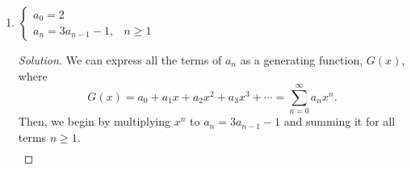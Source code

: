 \documentclass{article}
\newenvironment{solution}
  {\renewcommand\qedsymbol{$\blacksquare$}\begin{proof}[Solution]}
  {\end{proof}}
\begin{document}
\begin{enumerate}
\begin{solution}
        Then, since we have the equality $a_n = 2a_{n-1}$, we can multiply both sides by $x^n$ and get the sum of all the terms over $n\geq 1$. We do this so we can eventually solve for $G(x)$, itself an infinite series.\begin{align*} 
            a_n x^n &= 2a_{n-1} x^n \\
            \sum_{n=1}^\infty a_n x^n &= \sum_{n=1}^\infty 2a_{n-1} x^n 
            \intertext{Here, we need to use series manipulation techniques. The handouts are pretty good at explaining them, but I'll show them as clearly as possible regardless.}
            \sum_{n=1}^\infty a_n x^n &= 2\sum_{n=1}^\infty a_{n-1} x^n \\
            a_1 x + a_2 x^2 + a_3 x^3 + \cdots &= 2(a_0 x + a_1 x^2 + a_2 x^3 + \cdots ) &\text{expanding the series} \\
            (a_0 + a_1 x + a_2 x^2 + \cdots) - a_0 &= 2\cdot x(a_0 + a_1 x + a_2 x^2 + \cdots) &\text{factoring out}~x 
            \intertext{Now, we see that the series inside parentheses are equivalent to $G(x)$, so we can substitute.}
            G(x) - a_0 &= 2x \:G(x) \\ 
            G(x) - 3 &= 2x \:G(x) &\text{substituting}~a_0 =3 \\
            G(x) - 2x \:G(x) &= 3 &\text{isolating}~G(x) \\ 
            G(x) \:(1-2x) &= 3 \\ 
            G(x) &= \frac{3}{1-2x}.
        \end{align*} Now, to get a generalized formula for $a_n$, all we have to do is find the coefficient of some arbitrary $x^n$ in $G(x)$, since we've already established 
        that $G(x) = a_0 + a_1 x + a_2 x^2 + \cdots$.\[
            \big[x^n\big] \frac{3}{1-2x} = 3\cdot \big[x^n\big] \frac{1}{1-2x} = 3 \cdot 2^n.    
        \] Therfore,  when $a_0 = 3$ and $a_n = 2a_{n-1}$ if $n\geq 1$. 
    \end{solution} 
    \item $\begin{cases} a_0 = 2 & \\ a_n = 3a_{n-1} -1, & n\geq 1 \end{cases}$\begin{solution} 
        We can express all the terms of $a_n$ as a generating function, $G(x)$, where \[
            G(x) = a_0 + a_1 x + a_2 x^2 + a_3 x^3 + \cdots = \displaystyle{} \sum_{n=0}^\infty a_n x^n .
        \] Then, we begin by multiplying $x^n$ to $a_n = 3a_{n-1} -1$ and summing it for all terms $n\geq 1$.\begin{align*} 

\end{align*}
\end{solution}
\end{enumerate}
\end{document}
